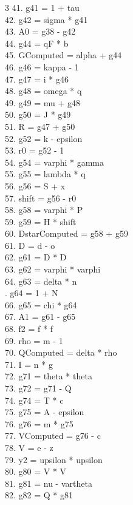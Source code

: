 \documentclass[10pt]{article}
\begin{document}
\begin{multicols}{3}
41. g41 = 1 + tau\\
42. g42 = sigma * g41\\
43. A0 = g38 - g42\\
44. g44 = qF * b\\
45. GComputed = alpha + g44\\
46. g46 = kappa - 1\\
47. g47 = i * g46\\
48. g48 = omega * q\\
49. g49 = mu + g48\\
50. g50 = J * g49\\
51. R = g47 + g50\\
52. g52 = k - epsilon\\
53. r0 = g52 - 1\\
54. g54 = varphi * gamma\\
55. g55 = lambda * q\\
56. g56 = S + x\\
57. shift = g56 - r0\\
58. g58 = varphi * P\\
59. g59 = H * shift\\
60. DstarComputed = g58 + g59\\
61. D = d - o\\
62. g61 = D * D\\
63. g62 = varphi * varphi\\
64. g63 = delta * n\\
. g64 = 1 + N\\
66. g65 = chi * g64\\
67. A1 = g61 - g65\\
68. f2 = f * f\\
69. rho = m - 1\\
70. QComputed = delta * rho\\
71. I = n * g\\
72. g71 = theta * theta\\
73. g72 = g71 - Q\\
74. g74 = T * c\\
75. g75 = A - epsilon\\
76. g76 = m * g75\\
77. VComputed = g76 - c\\
78. V = e - z\\
79. y2 = upsilon * upsilon\\
80. g80 = V * V\\
81. g81 = nu - vartheta\\
82. g82 = Q * g81\\

\end{multicols}
\end{document}
